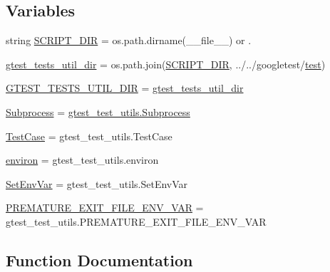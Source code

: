 \subsection*{Variables}
\begin{DoxyCompactItemize}
\item 
string \mbox{\hyperlink{namespacegmock__test__utils_a4ef94affd9d889f78d67be80017eeddd}{S\+C\+R\+I\+P\+T\+\_\+\+D\+IR}} = os.\+path.\+dirname(\+\_\+\+\_\+file\+\_\+\+\_\+) or \textquotesingle{}.\textquotesingle{}
\item 
\mbox{\hyperlink{namespacegmock__test__utils_af6d94170502149e7f99cfa73ddc13c00}{gtest\+\_\+tests\+\_\+util\+\_\+dir}} = os.\+path.\+join(\mbox{\hyperlink{namespacegmock__test__utils_a4ef94affd9d889f78d67be80017eeddd}{S\+C\+R\+I\+P\+T\+\_\+\+D\+IR}}, \textquotesingle{}../../googletest/\mbox{\hyperlink{_mutual_8h_a707ee03719e99670bf6cfdfd897b8456}{test}}\textquotesingle{})
\item 
\mbox{\hyperlink{namespacegmock__test__utils_ae7ee9324ba489b3cbd99c5e26006eba9}{G\+T\+E\+S\+T\+\_\+\+T\+E\+S\+T\+S\+\_\+\+U\+T\+I\+L\+\_\+\+D\+IR}} = \mbox{\hyperlink{namespacegmock__test__utils_af6d94170502149e7f99cfa73ddc13c00}{gtest\+\_\+tests\+\_\+util\+\_\+dir}}
\item 
\mbox{\hyperlink{namespacegmock__test__utils_a31a0e33565ec805d314cb0a4eb8317e6}{Subprocess}} = \mbox{\hyperlink{classgtest__test__utils_1_1_subprocess}{gtest\+\_\+test\+\_\+utils.\+Subprocess}}
\item 
\mbox{\hyperlink{namespacegmock__test__utils_a959c5af591e4d49b6d35745205b64509}{Test\+Case}} = gtest\+\_\+test\+\_\+utils.\+Test\+Case
\item 
\mbox{\hyperlink{namespacegmock__test__utils_a6f0938b5e8839ebc847b52a38f4d35e3}{environ}} = gtest\+\_\+test\+\_\+utils.\+environ
\item 
\mbox{\hyperlink{namespacegmock__test__utils_ab0c69f8ce649fdd5a17f99deedf3eb29}{Set\+Env\+Var}} = gtest\+\_\+test\+\_\+utils.\+Set\+Env\+Var
\item 
\mbox{\hyperlink{namespacegmock__test__utils_a9392c288e6da3024d65ec0bddc0d86c3}{P\+R\+E\+M\+A\+T\+U\+R\+E\+\_\+\+E\+X\+I\+T\+\_\+\+F\+I\+L\+E\+\_\+\+E\+N\+V\+\_\+\+V\+AR}} = gtest\+\_\+test\+\_\+utils.\+P\+R\+E\+M\+A\+T\+U\+R\+E\+\_\+\+E\+X\+I\+T\+\_\+\+F\+I\+L\+E\+\_\+\+E\+N\+V\+\_\+\+V\+AR
\end{DoxyCompactItemize}


\subsection{Function Documentation}
\mbox{\label{namespacegmock__test__utils_a9146f81ff42389086b3eaee25dbf0263}} 
